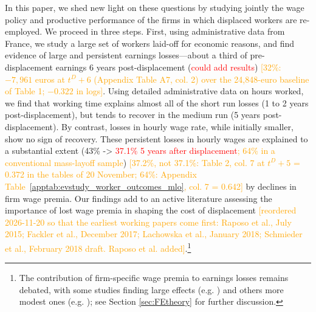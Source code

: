 In this paper, we shed new light on these questions by studying jointly the wage policy and productive performance of the firms in which displaced workers are re-employed. We proceed in three steps. First, using administrative data from France, we study a large set of workers laid-off for economic reasons, and find evidence of large and persistent earnings losses---about a third of pre-displacement earnings 6 years post-displacement (\textcolor{red}{could add results}) \textcolor{orange}{[32\%: $-7{,}961$ euros at $t^D+6$ (Appendix Table A7, col. 2) over the 24,848-euro baseline of Table 1; $-0.322$ in logs]}. Using detailed administrative data on hours worked, we find that working time explains almost all of the short run losses (1 to 2 years post-displacement), but tends to recover in the medium run (5 years post-displacement). By contrast, losses in hourly wage rate, while initially smaller, show no sign of recovery. These persistent losses in hourly wages are explained to a substantial extent (43\% -> \textcolor{red}{37.1\% 5 years after displacement}\textcolor{orange}{; 64\% in a conventional mass-layoff sample}) \textcolor{orange}{[37.2\%, not 37.1\%: Table 2, col. 7 at $t^D+5$ = 0.372 in the tables of 20 November; 64\%: Appendix Table~\ref{apptab:evstudy_worker_outcomes_mlo}, col. 7 = 0.642]} by declines in firm wage premia. Our findings add to an active literature assessing the importance of lost wage premia in shaping the cost of displacement \textcolor{orange}{\citep{raposo2021sources,fackler2017explaining,Lachowska2020,Schmieder2020,Gulyas2019,moore2019firm,bertheau_etal_2023,helm2022}} \textcolor{orange}{[reordered 2026-11-20 so that the earliest working papers come first: Raposo et al., July 2015; Fackler et al., December 2017; Lachowska et al., January 2018; Schmieder et al., February 2018 draft. Raposo et al. added]}.\footnote{The contribution of firm-specific wage premia to earnings losses remains debated, with some studies finding large effects (e.g. \citealp{Gulyas2019,Schmieder2020}) and others more modest ones (e.g. \citealp{Lachowska2020}); see Section \ref{sec:FEtheory} for further discussion.}


